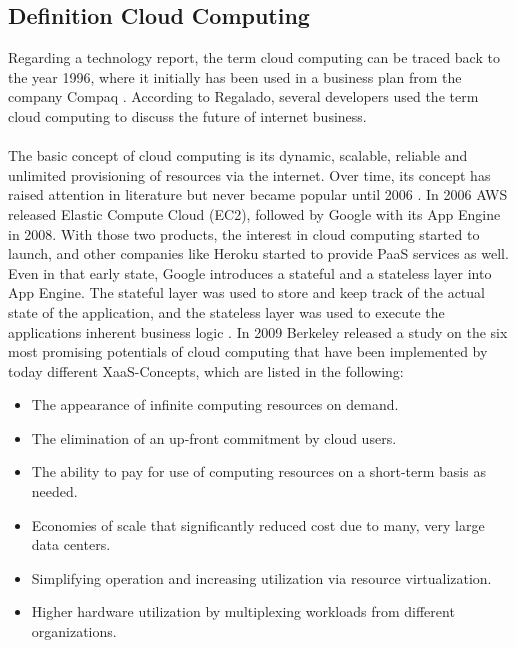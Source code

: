 \documentclass[a4paper,11pt, pagesize]{scrartcl}
\begin{document}
\begin{spacing}{1.2}
\subsection{Definition Cloud Computing}
Regarding a technology report, the term cloud computing can be traced back to the year 1996, where it initially has been used in a business plan from the company Compaq \cite{regalado2011coined}. According to Regalado, several developers used the term cloud computing to discuss the future of internet business.\\\\ The basic concept of cloud computing is its dynamic, scalable, reliable and unlimited provisioning of resources via the internet. Over time, its concept has raised attention in literature but never became popular until 2006 \cite{fox2009above}. In 2006 AWS released Elastic Compute Cloud (EC2), followed by Google with its App Engine in 2008. With those two products, the interest in cloud computing started to launch, and other companies like Heroku started to provide PaaS services as well. Even in that early state, Google introduces a stateful and a stateless layer into App Engine. The stateful layer was used to store and keep track of the actual state of the application, and the stateless layer was used to execute the applications inherent business logic \cite{fox2009above}. In 2009 Berkeley released a study on the six most promising potentials of cloud computing that have been implemented by today different XaaS-Concepts, which are listed in the following: \\ 
\begin{itemize}
\item[1.] The appearance of infinite computing resources on demand. 
\item[2.] The elimination of an up-front commitment by cloud users.
\item[3.] The ability to pay for use of computing resources on a short-term basis as needed.
\item[4.] Economies of scale that significantly reduced cost due to many, very large data centers.
\item[5.] Simplifying operation and increasing utilization via resource virtualization.
\item[6.] Higher hardware utilization by multiplexing workloads from different organizations.
\end{itemize}

\end{spacing}
\end{document}
